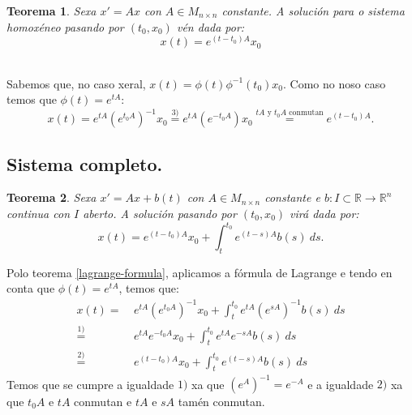 \documentclass[11pt, a4paper,twoside]{article}
\makeatletter
\theoremstyle{theorem-style}  %
\newtheorem{theorem}{Teorema}[section]  %
\renewenvironment{proof}[1][\proofname]{\par
	\pushQED{\qed}%
	\normalfont \topsep6\p@\@plus6\p@\relax
	\list{}{%
		\settowidth{\leftmargin}{\quad:\hskip\labelsep}%
		\setlength{\labelwidth}{0pt}%
		\setlength{\itemindent}{-\leftmargin}%
	}%
	\item[\hskip\labelsep\itshape#1\@addpunct{:}]\ignorespaces
}{%
	\popQED\endlist\@endpefalse
}
\theoremstyle{definition-style}
\theoremstyle{example-style}
\makeatother
\begin{document}
\begin{theorem}
	Sexa $x' = Ax$ con $A \in M_{n \times n}$ constante. A solución para o sistema homoxéneo pasando por $(t_0, x_0)$ vén dada por:
	\[x(t) = e^{(t - t_0)A}x_0\]
\end{theorem}
\begin{proof}\ \\
	Sabemos que, no caso xeral, $x(t) = \phi (t) \phi^{-1} (t_0) x_0$. Como no noso caso temos que $\phi (t) = e^{tA}$:
	\[x(t) = e^{tA}(e^{t_0A})^{-1}x_0 \stackrel{3)}{=} e^{tA}(e^{-t_0A})x_0 \stackrel{tA \text{ y } t_0A \text{ conmutan}}{=} e^{(t - t_0)A}.\]
\end{proof}
\subsection{Sistema completo.}
\begin{theorem}
	Sexa $x' = Ax + b(t)$ con $A \in M_{n \times n}$ constante e $ b:I \subset \mathbb{R} \longrightarrow \mathbb{R}^n $	continua con $I$ aberto. A solución pasando por $(t_0, x_0)$ virá dada por:
	\[x(t) = e^{(t - t_0)A}x_0 + \int_{t}^{t_0}e^{(t - s)A}b(s) \ ds.\]
\end{theorem}
\begin{proof}
	Polo teorema \ref{lagrange-formula}, aplicamos a fórmula de Lagrange e tendo en conta que $\phi (t) = e^{tA}$, temos que:
	\begin{align*}
	x(t) =& \ e^{tA}(e^{t_0A})^{-1}x_0 + \int_{t}^{t_0} e^{tA}(e^{sA})^{-1} b(s) \ ds  \\
	\stackrel{1)}{=}& \ e^{tA}e^{-t_0A}x_0 + \int_{t}^{t_0}e^{tA}e^{-sA} b(s) \ ds \\
	\stackrel{2)}{=}& \ e^{(t-t_0)A}x_0 + \int_{t}^{t_0}e^{(t-s)A} b(s) \ ds
	\end{align*}
	Temos que se cumpre a igualdade $1)$ xa que $(e^A)^{-1} = e^{-A}$ e a igualdade $2)$ xa que $t_0A$ e $tA$ conmutan e $tA$ e $sA$ tamén conmutan.
\end{proof}
\end{document}
